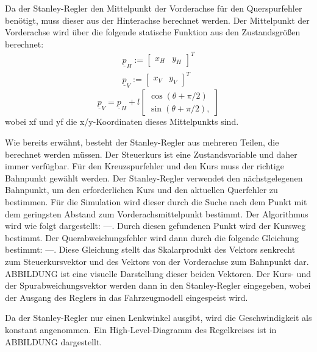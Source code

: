 \documentclass[arbeit=studie,oneside,BCOR=12mm]{ArbeitRST}
\begin{document}
Da der Stanley-Regler den Mittelpunkt der Vorderachse für den Querspurfehler 
benötigt, muss dieser aus der Hinterachse berechnet werden.
Der Mittelpunkt der Vorderachse wird über die folgende statische Funktion aus 
den Zustandsgrößen berechnet:
\begin{gather}
    \underline{p}_H := 
    \begin{bmatrix}
        x_H & y_H
    \end{bmatrix}^T \\
    \underline{p}_V := 
    \begin{bmatrix}
        x_V & y_V
    \end{bmatrix}^T
    \label{eq:Hinterradachse und Vorderradachse}
\end{gather}
\begin{equation}
    \underline{p}_V = \underline{p}_H + l 
    \begin{bmatrix}
        \cos(\theta + \pi/2) \\ 
        \sin(\theta + \pi/2),
    \end{bmatrix}
    \label{eq:Transformation von Hinterradachse zu Vorderradachse}
\end{equation}
wobei xf und yf die x/y-Koordinaten dieses Mittelpunkts sind. 

Wie bereits erwähnt, besteht der Stanley-Regler aus mehreren Teilen, die
berechnet werden müssen. Der Steuerkurs ist eine Zustandsvariable und daher 
immer verfügbar. Für den Kreuzspurfehler und den Kurs muss der richtige 
Bahnpunkt gewählt werden. Der Stanley-Regler verwendet den nächstgelegenen 
Bahnpunkt, um den erforderlichen Kurs und den aktuellen Querfehler zu bestimmen.
Für die Simulation wird dieser durch die Suche nach dem Punkt mit dem geringsten
Abstand zum Vorderachsmittelpunkt bestimmt. Der Algorithmus wird wie folgt 
dargestellt: 
---.
Durch diesen gefundenen Punkt wird der Kursweg bestimmt. Der 
Querabweichungsfehler wird dann durch die folgende Gleichung bestimmt:
---.
Diese Gleichung stellt das Skalarprodukt des Vektors senkrecht zum 
Steuerkursvektor und des Vektors von der Vorderachse zum Bahnpunkt dar. 
ABBILDUNG ist eine visuelle Darstellung dieser beiden Vektoren.
Der Kurs- und der Spurabweichungsvektor werden dann in den Stanley-Regler 
eingegeben, wobei der Ausgang des Reglers in das Fahrzeugmodell eingespeist 
wird. 

Da der Stanley-Regler nur einen Lenkwinkel ausgibt, wird die Geschwindigkeit als
konstant angenommen. 
Ein High-Level-Diagramm des Regelkreises ist in ABBILDUNG dargestellt.
\end{document}
